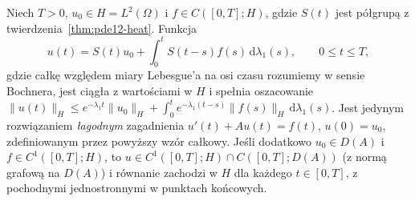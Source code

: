 \begin{twierdzenie}
\label{thm:pde12-duhamel}
Niech $T>0$, $u_0\in H=L^2(\Omega)$ i
$f\in C([0,T];H)$, gdzie $S(t)$ jest półgrupą
z twierdzenia~\ref{thm:pde12-heat}. Funkcja
\[
u(t)=S(t)u_0+\int_0^tS(t-s)f(s)\,\mathrm d\lambda_1(s),
\qquad 0\le t\le T,
\]
gdzie całkę względem miary Lebesgue'a na osi czasu
rozumiemy w sensie Bochnera, jest ciągła
z wartościami w $H$ i spełnia oszacowanie
$\|u(t)\|_H\le e^{-\lambda_1t}\|u_0\|_H
+\int_0^te^{-\lambda_1(t-s)}\|f(s)\|_H\,\mathrm d\lambda_1(s)$.
Jest jedynym rozwiązaniem \emph{łagodnym} zagadnienia
$u'(t)+Au(t)=f(t)$, $u(0)=u_0$, zdefiniowanym
przez powyższy wzór całkowy. Jeśli dodatkowo
$u_0\in D(A)$ i $f\in C^1([0,T];H)$, to
$u\in C^1([0,T];H)\cap C([0,T];D(A))$
(z normą grafową na $D(A)$) i równanie zachodzi w $H$
dla każdego $t\in[0,T]$, z pochodnymi jednostronnymi
w punktach końcowych.
\end{twierdzenie}
